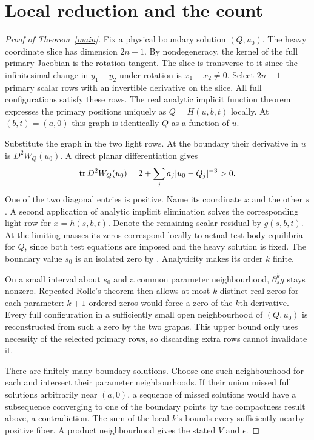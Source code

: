 \documentclass[11pt]{article}
\begin{document}
\section{Local reduction and the count}
\begin{proof}[Proof of Theorem~\ref{main}]
Fix a physical boundary solution $(Q,u_0)$. The heavy coordinate slice has dimension $2n-1$. By nondegeneracy, the kernel of the full primary Jacobian is the rotation tangent. The slice is transverse to it since the infinitesimal change in $y_1-y_2$ under rotation is $x_1-x_2\ne0$. Select $2n-1$ primary scalar rows with an invertible derivative on the slice. All full configurations satisfy these rows. The real analytic implicit function theorem expresses the primary positions uniquely as $Q=H(u,b,t)$ locally. At $(b,t)=(a,0)$ this graph is identically $Q$ as a function of $u$.

Substitute the graph in the two light rows. At the boundary their derivative in $u$ is $D^2W_Q(u_0)$. A direct planar differentiation gives
\begin{equation}\label{trace}
 \mathop{\rm tr}D^2W_Q(u_0)=2+\sum_j a_j |u_0-Q_j|^{-3}>0.
\end{equation}
One of the two diagonal entries is positive. Name its coordinate $x$ and the other $s$. A second application of analytic implicit elimination solves the corresponding light row for $x=h(s,b,t)$. Denote the remaining scalar residual by $g(s,b,t)$. At the limiting masses its zeros correspond locally to actual test-body equilibria for $Q$, since both test equations are imposed and the heavy solution is fixed. The boundary value $s_0$ is an isolated zero by \cite{hj}. Analyticity makes its order $k$ finite.

On a small interval about $s_0$ and a common parameter neighbourhood, $\partial_s^k g$ stays nonzero. Repeated Rolle's theorem then allows at most $k$ distinct real zeros for each parameter: $k+1$ ordered zeros would force a zero of the $k$th derivative. Every full configuration in a sufficiently small open neighbourhood of $(Q,u_0)$ is reconstructed from such a zero by the two graphs. This upper bound only uses necessity of the selected primary rows, so discarding extra rows cannot invalidate it.

There are finitely many boundary solutions. Choose one such neighbourhood for each and intersect their parameter neighbourhoods. If their union missed full solutions arbitrarily near $(a,0)$, a sequence of missed solutions would have a subsequence converging to one of the boundary points by the compactness result above, a contradiction. The sum of the local $k$'s bounds every sufficiently nearby positive fiber. A product neighbourhood gives the stated $V$ and $\epsilon$.
\end{proof}
\end{document}
